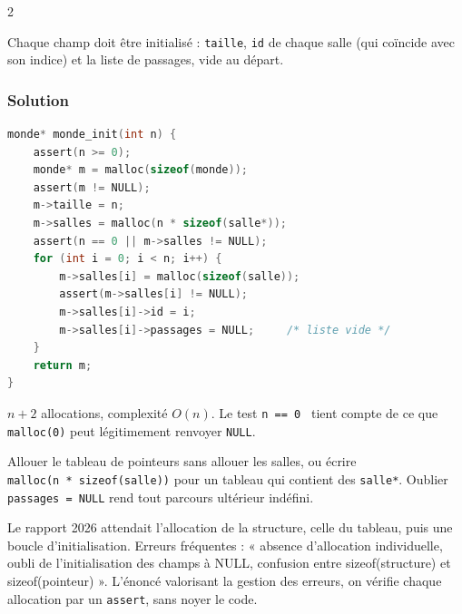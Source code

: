 \documentclass[11pt,a4paper]{article}
\begin{document}
\begin{indication}{2}

Chaque champ doit être initialisé : \texttt{taille}, \texttt{id} de chaque salle (qui coïncide avec son indice) et la liste de passages, vide au départ.

\end{indication}

\hypertarget{solution-5}{%
\subsubsection{Solution}\label{solution-5}}

\begin{lstlisting}[language=C]
monde* monde_init(int n) {
    assert(n >= 0);
    monde* m = malloc(sizeof(monde));
    assert(m != NULL);
    m->taille = n;
    m->salles = malloc(n * sizeof(salle*));
    assert(n == 0 || m->salles != NULL);
    for (int i = 0; i < n; i++) {
        m->salles[i] = malloc(sizeof(salle));
        assert(m->salles[i] != NULL);
        m->salles[i]->id = i;
        m->salles[i]->passages = NULL;     /* liste vide */
    }
    return m;
}
\end{lstlisting}

\(n + 2\) allocations, complexité \(O(n)\). Le test \texttt{n\ ==\ 0\ \textbar{}\textbar{}} tient compte de ce que \texttt{malloc(0)} peut légitimement renvoyer \texttt{NULL}.

\begin{piege}

Allouer le tableau de pointeurs sans allouer les salles, ou écrire \texttt{malloc(\allowbreak{}n\ *\ sizeof(\allowbreak{}salle)\allowbreak{})\allowbreak{}} pour un tableau qui contient des \texttt{salle*}. Oublier \texttt{passages\ =\ NULL} rend tout parcours ultérieur indéfini.

\end{piege}

\begin{jury}

Le rapport 2026 attendait l'allocation de la structure, celle du tableau, puis une boucle d'initialisation. Erreurs fréquentes : « absence d'allocation individuelle, oubli de l'initialisation des champs à NULL, confusion entre sizeof(structure) et sizeof(pointeur) ». L'énoncé valorisant la gestion des erreurs, on vérifie chaque allocation par un \texttt{assert}, sans noyer le code.

\end{jury}
\end{document}
